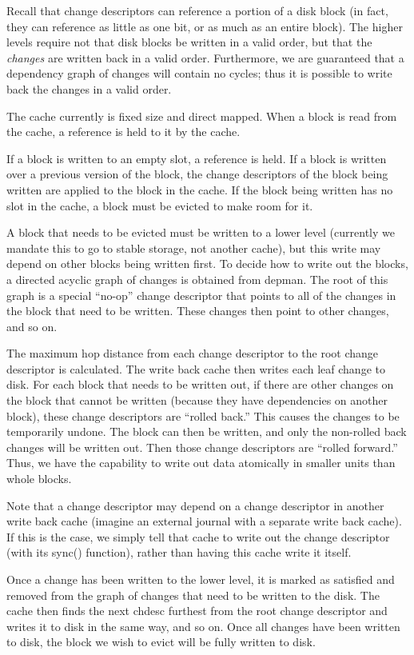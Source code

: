 Recall that change descriptors can reference a portion of a disk block (in fact,
they can reference as little as one bit, or as much as an entire block). The
higher levels require not that disk blocks be written in a valid order, but that
the \emph{changes} are written back in a valid order. Furthermore, we are
guaranteed that a dependency graph of changes will contain no cycles; thus it is
possible to write back the changes in a valid order.

The cache currently is fixed size and direct mapped. When a block is read from
the cache, a reference is held to it by the cache.

If a block is written to an empty slot, a reference is held. If a block is
written over a previous version of the block, the change descriptors of the
block being written are applied to the block in the cache. If the block being
written has no slot in the cache, a block must be evicted to make room for it.

A block that needs to be evicted must be written to a lower level (currently we
mandate this to go to stable storage, not another cache), but this write may
depend on other blocks being written first. To decide how to write out the
blocks, a directed acyclic graph of changes is obtained from depman. The root of
this graph is a special ``no-op'' change descriptor that points to all of the
changes in the block that need to be written. These changes then point to other
changes, and so on.

The maximum hop distance from each change descriptor to the root change
descriptor is calculated. The write back cache then writes each leaf change to
disk. For each block that needs to be written out, if there are other changes on
the block that cannot be written (because they have dependencies on another
block), these change descriptors are ``rolled back.'' This causes the changes to
be temporarily undone. The block can then be written, and only the non-rolled
back changes will be written out. Then those change descriptors are ``rolled
forward.'' Thus, we have the capability to write out data atomically in smaller
units than whole blocks.

Note that a change descriptor may depend on a change descriptor in another write
back cache (imagine an external journal with a separate write back cache). If
this is the case, we simply tell that cache to write out the change descriptor
(with its sync() function), rather than having this cache write it itself.

Once a change has been written to the lower level, it is marked as satisfied and
removed from the graph of changes that need to be written to the disk. The cache
then finds the next chdesc furthest from the root change descriptor and writes
it to disk in the same way, and so on. Once all changes have been written to
disk, the block we wish to evict will be fully written to disk.

